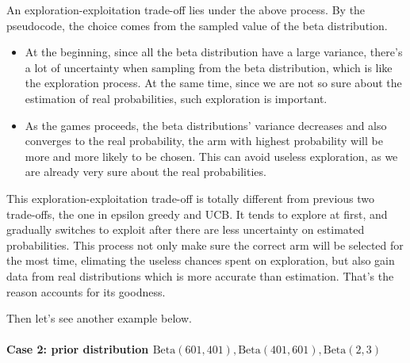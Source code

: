 \documentclass[11pt]{article}
\begin{document}
An exploration-exploitation trade-off lies under the above process. By
the pseudocode, the choice comes from the sampled value of the beta
distribution.

\begin{itemize}
\item
  At the beginning, since all the beta distribution have a large
  variance, there's a lot of uncertainty when sampling from the beta
  distribution, which is like the exploration process. At the same time,
  since we are not so sure about the estimation of real probabilities,
  such exploration is important.
\item
  As the games proceeds, the beta distributions' variance decreases and
  also converges to the real probability, the arm with highest
  probability will be more and more likely to be chosen. This can avoid
  useless exploration, as we are already very sure about the real
  probabilities.
\end{itemize}

This exploration-exploitation trade-off is totally different from
previous two trade-offs, the one in epsilon greedy and UCB. It tends to
explore at first, and gradually switches to exploit after there are less
uncertainty on estimated probabilities. This process not only make sure
the correct arm will be selected for the most time, elimating the
useless chances spent on exploration, but also gain data from real
distributions which is more accurate than estimation. That's the reason
accounts for its goodness.

Then let's see another example below.

    \hypertarget{case-2-prior-distribution-mathrmbeta601-401-mathrmbeta401-601-mathrmbeta23}{%
\paragraph{\texorpdfstring{Case 2: prior distribution
\(\mathrm{Beta}(601, 401), \mathrm{Beta}(401, 601), \mathrm{Beta}(2,3)\)}{Case 2: prior distribution \textbackslash mathrm\{Beta\}(601, 401), \textbackslash mathrm\{Beta\}(401, 601), \textbackslash mathrm\{Beta\}(2,3)}}\label{case-2-prior-distribution-mathrmbeta601-401-mathrmbeta401-601-mathrmbeta23}}
\end{document}
